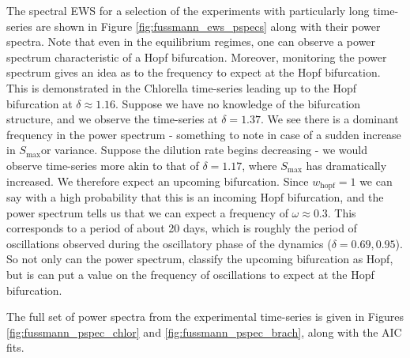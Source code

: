 \documentclass[10pt]{article}
\begin{document}
The spectral EWS for a selection of the experiments with particularly long time-series are shown in Figure \ref{fig:fussmann_ews_pspecs} along with their power spectra. Note that even in the equilibrium regimes, one can observe a power spectrum characteristic of a Hopf bifurcation. Moreover, monitoring the power spectrum gives an idea as to the frequency to expect at the Hopf bifurcation. This is demonstrated in the Chlorella time-series leading up to the Hopf bifurcation at $\delta\approx 1.16$. Suppose we have no knowledge of the bifurcation structure, and we observe the time-series at $\delta = 1.37$. We see there is a dominant frequency in the power spectrum - something to note in case of a sudden increase in $S_{\text{max}}$or variance. Suppose the dilution rate begins decreasing - we would observe time-series more akin to that of $\delta=1.17$, where $S_{\text{max}}$ has dramatically increased. We therefore expect an upcoming bifurcation. Since $w_{\text{hopf}}=1$ we can say with a high probability that this is an incoming Hopf bifurcation, and the power spectrum tells us that we can expect a frequency of $\omega\approx0.3$. This corresponds to a period of about 20 days, which is roughly the period of oscillations observed during the oscillatory phase of the dynamics ($\delta=0.69,0.95$). So not only can the power spectrum, classify the upcoming bifurcation as Hopf, but is can put a value on the frequency of oscillations to expect at the Hopf bifurcation.

The full set of power spectra from the experimental time-series is given in Figures \ref{fig:fussmann_pspec_chlor} and \ref{fig:fussmann_pspec_brach}, along with the AIC fits.


\end{document}
